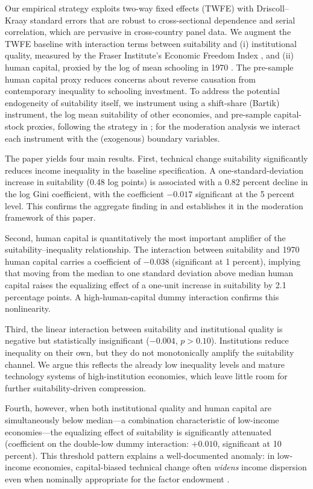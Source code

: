 \documentclass[12pt]{article}
\begin{document}
Our empirical strategy exploits two-way fixed effects (TWFE) with
Driscoll--Kraay standard errors \citep{driscoll1998consistent} that
are robust to cross-sectional dependence and serial correlation,
which are pervasive in cross-country panel data.
We augment the TWFE baseline with interaction terms between
suitability and (i) institutional quality, measured by the
Fraser Institute's Economic Freedom Index \citep{gwartney2020economic},
and (ii) human capital, proxied by the log of mean schooling in 1970
\citep{barro1996schooling}. The pre-sample human capital proxy
reduces concerns about reverse causation from contemporary inequality
to schooling investment.
To address the potential endogeneity of suitability itself,
we instrument using a shift-share (Bartik) instrument, the log mean
suitability of other economies, and pre-sample capital-stock proxies,
following the strategy in \citet{li2026prosperity};
for the moderation analysis we interact each instrument with the
(exogenous) boundary variables.

The paper yields four main results.
First, technical change suitability significantly reduces income
inequality in the baseline specification.
A one-standard-deviation increase in suitability (0.48 log points)
is associated with a 0.82 percent decline in the log Gini
coefficient, with the coefficient $-0.017$ significant at the 5
percent level.
This confirms the aggregate finding in \citet{li2026prosperity} and
establishes it in the moderation framework of this paper.

Second, human capital is quantitatively the most important amplifier
of the suitability--inequality relationship.
The interaction between suitability and 1970 human capital carries
a coefficient of $-0.038$ (significant at 1 percent), implying
that moving from the median to one standard deviation above median
human capital raises the equalizing effect of a one-unit increase
in suitability by 2.1 percentage points.
A high-human-capital dummy interaction confirms this nonlinearity.

Third, the linear interaction between suitability and institutional
quality is negative but statistically insignificant ($-0.004$, $p>0.10$).
Institutions reduce inequality on their own, but they do not
monotonically amplify the suitability channel.
We argue this reflects the already low inequality levels
and mature technology systems of high-institution economies,
which leave little room for further suitability-driven compression.

Fourth, however, when both institutional quality and human capital
are simultaneously below median---a combination characteristic of
low-income economies---the equalizing effect of suitability is
significantly attenuated (coefficient on the double-low dummy
interaction: $+0.010$, significant at 10 percent).
This threshold pattern explains a well-documented anomaly: in low-income
economies, capital-biased technical change often \emph{widens}
income dispersion even when nominally appropriate for the factor
endowment \citep{jaumotte2013rising}.
\end{document}
